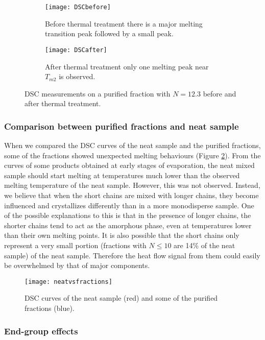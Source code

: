 \begin{figure}[H]
	\centering
\begin{subfigure}[b]{0.5\linewidth}
	\texttt{[image: DSCbefore]}
	\caption{Before thermal treatment there is a major melting transition peak followed by a small peak.}
\end{subfigure}
\begin{subfigure}[b]{0.5\linewidth}
	\texttt{[image: DSCafter]}
	\caption{After thermal treatment only one melting peak near $T_{m2}$ is observed.}
\end{subfigure}
\caption{DSC measurements on a purified fraction with $N = 12.3$ before and after thermal treatment.}
\label{fig:DSC before and after}
\end{figure}

\subsubsection{Comparison between purified fractions and neat sample}

When we compared the DSC curves of the neat sample and the purified fractions, some of the fractions showed unexpected melting behaviours (Figure \ref{fig:neatvsfractions}). From the curves of some products obtained at early stages of evaporation, the neat mixed sample should start melting at temperatures much lower than the observed melting temperature of the neat sample. However, this was not observed. Instead, we believe that when the short chains are mixed with longer chains, they become influenced and crystallizes differently than in a more monodisperse sample. One of the possible explanations to this is that in the presence of longer chains, the shorter chains tend to act as the amorphous phase, even at temperatures lower than their own melting points. It is also possible that the short chains only represent a very small portion (fractions with $N \leq 10$ are 14\% of the neat sample) of the neat sample. Therefore the heat flow signal from them could easily be overwhelmed by that of major components.

\begin{figure}[H]
\center
\texttt{[image: neatvsfractions]}
\caption{DSC curves of the neat sample (red) and some of the purified fractions (blue).}
\label{fig:neatvsfractions}
\end{figure}

\subsubsection{End-group effects}

